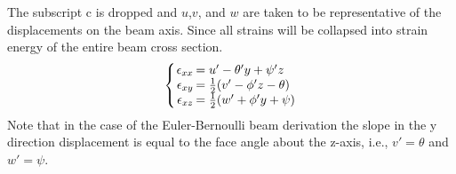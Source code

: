 The subscript c is dropped and $ u $,$ v $, and $ w $ are taken to be representative of the displacements on the beam axis. Since all strains will be collapsed into strain energy of the entire beam cross section. 
\begin{equation}\label{eq:StrainEvaluatedSimple}
\left\{\arraycolsep=1pt\begin{array}{rl}
\epsilon_{xx}&=u'-\theta'y+\psi'z\\
\epsilon_{xy}&=\frac{1}{2}(v'-\phi'z-\theta)\\
\epsilon_{xz}&=\frac{1}{2}(w'+\phi'y+\psi)
\end{array}\right.
\end{equation}
Note that in the case of the Euler-Bernoulli beam derivation the slope in the y direction displacement is equal to the face angle about the z-axis, i.e., $v'=\theta$ and $w'=\psi$.\

